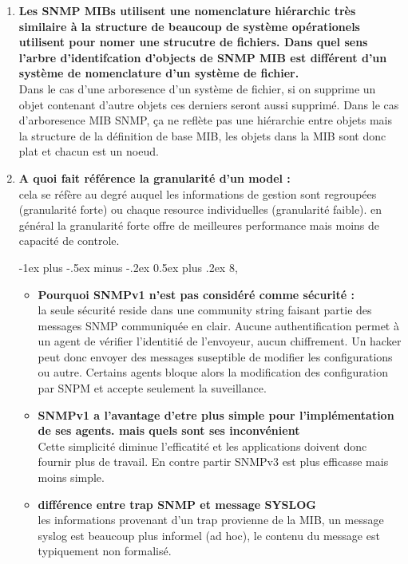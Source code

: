 \documentclass[12pt,landscape]{article}
\makeatletter
\renewcommand{\section}{\@startsection{section}{1}{0mm}%
                                {-1ex plus -.5ex minus -.2ex}%
                                {0.5ex plus .2ex}%
                                {\normalfont\large\bfseries}}
\makeatother
\begin{document}
\begin{multicols}{2}
\begin{enumerate}
\item \textbf{Les SNMP MIBs utilisent une nomenclature hiérarchic très similaire à la structure de beaucoup de système opérationels utilisent pour nomer une strucutre de fichiers. Dans quel sens l'arbre d'identifcation d'objects de SNMP MIB est différent d'un système de nomenclature d'un système de fichier.}\\
Dans le cas d'une arboresence d'un système de fichier, si on supprime un objet contenant d'autre objets ces derniers seront aussi supprimé.
Dans le cas d'arboresence MIB SNMP, ça ne reflète pas une hiérarchie entre objets mais la structure de la définition de base MIB, les objets dans la MIB sont donc plat et chacun est un noeud.

\item \textbf{A quoi fait référence la granularité d'un model :}\\
cela se réfère au degré auquel les informations de gestion sont regroupées (granularité forte) ou chaque resource individuelles (granularité faible). en général la granularité forte offre de meilleures performance mais moins de capacité de controle.

\section{8,}
\begin{itemize}
 \item \textbf{Pourquoi SNMPv1 n'est pas considéré comme sécurité : }\\
 la seule sécurité reside dans une community string faisant partie des messages SNMP communiquée en clair. Aucune authentification permet à un agent de vérifier l'identitié de l'envoyeur, aucun chiffrement. Un hacker peut donc envoyer des messages suseptible de modifier les configurations ou autre. Certains agents bloque alors la modification des configuration par SNPM et accepte seulement la suveillance.
 
 \item \textbf{SNMPv1 a l'avantage d'etre plus simple pour l'implémentation de ses agents. mais quels sont ses inconvénient}\\
 Cette simplicité diminue l'efficatité et les applications doivent donc fournir plus de travail. En contre partir SNMPv3 est plus efficasse mais moins simple.
 
 \item \textbf{différence entre trap SNMP et message SYSLOG}\\
 les informations provenant d'un trap provienne de la MIB, un message syslog est beaucoup plus informel (ad hoc), le contenu du message est typiquement non formalisé.
 

\end{itemize}
\end{enumerate}
\end{multicols}
\end{document}
